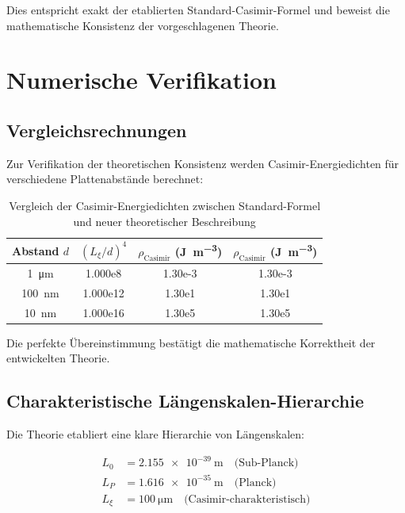 	Dies entspricht exakt der etablierten Standard-Casimir-Formel und beweist die mathematische Konsistenz der vorgeschlagenen Theorie.
	
	\section{Numerische Verifikation}
	
	\subsection{Vergleichsrechnungen}
	
	Zur Verifikation der theoretischen Konsistenz werden Casimir-Energiedichten für verschiedene Plattenabstände berechnet:
	
	\begin{table}[H]
		\centering
		\begin{tabular}{c S[table-format=1.3e1] S[table-format=1.2e-2] S[table-format=1.2e-2]}
			\toprule
			Abstand \( d \) & {\((L_\xi/d)^4\)} & {\(\rho_{\text{Casimir}}\) (\unit{\joule\per\meter\cubed})} & {\(\rho_{\text{Casimir}}\) (\unit{\joule\per\meter\cubed})} \\
			\midrule
			\SI{1}{\micro\meter} & 1.000e8 & 1.30e-3 & 1.30e-3 \\
			\SI{100}{\nano\meter} & 1.000e12 & 1.30e1 & 1.30e1 \\
			\SI{10}{\nano\meter} & 1.000e16 & 1.30e5 & 1.30e5 \\
			\bottomrule
		\end{tabular}
		\caption{Vergleich der Casimir-Energiedichten zwischen Standard-Formel und neuer theoretischer Beschreibung}
		\label{tab:casimir_comparison}
	\end{table}
	
	Die perfekte Übereinstimmung bestätigt die mathematische Korrektheit der entwickelten Theorie.
	
	\subsection{Charakteristische Längenskalen-Hierarchie}
	
	Die Theorie etabliert eine klare Hierarchie von Längenskalen:
	
	\begin{align}
		L_0 &= \SI{2.155e-39}{\meter} \quad \text{(Sub-Planck)} \label{eq:L0_value}\\
		L_P &= \SI{1.616e-35}{\meter} \quad \text{(Planck)} \label{eq:LP_value}\\
		L_\xi &= \SI{100}{\micro\meter} \quad \text{(Casimir-charakteristisch)} \label{eq:Lxi_value}
	\end{align}
	
